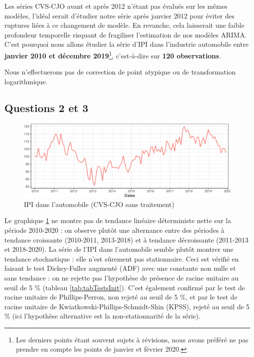 \documentclass[]{article}
\begin{document}
Les séries CVS-CJO avant et après 2012 n'étant pas évalués sur les mêmes modèles, l'idéal serait d'étudier notre série après janvier 2012 pour éviter des ruptures liées à ce changement de modèle. En revanche, cela laisserait une faible profondeur temporelle risquant de fragiliser l'estimation de nos modèles ARIMA.
C'est pourquoi nous allons étudier la série d'IPI dans l'industrie automobile entre \textbf{janvier 2010 et décembre 2019}\footnote{Les derniers points étant souvent sujets à révisions, nous avons préféré ne pas prendre en compte les points de janvier et février 2020.}, c'est-à-dire sur \textbf{120 observations}.

Nous n'effectuerons pas de correction de point atypique ou de transformation logarithmique.

\hypertarget{questions-2-et-3}{%
\subsection{Questions 2 et 3}\label{questions-2-et-3}}

\begin{figure}

{\centering \includegraphics{img/rmd-ipiBrut-1} 

}

\caption{IPI dans l'automobile (CVS-CJO sans traitement)}\label{fig:ipiBrut}
\end{figure}

Le graphique \ref{fig:ipiBrut} ne montre pas de tendance linéaire déterministe nette sur la période 2010-2020 : on observe plutôt une alternance entre des périodes à tendance croissante (2010-2011, 2013-2018) et à tendance décroissante (2011-2013 et 2018-2020).
La série de l'IPI dans l'automobile semble plutôt montrer une tendance stochastique : elle n'est sûrement pas stationnaire. Ceci est vérifié en faisant le test Dickey-Fuller augmenté (ADF) avec une constante non nulle et sans tendance : on ne rejette pas l'hypothèse de présence de racine unitaire au seuil de 5 \% (tableau \ref{tab:tabTestsInit}).
C'est également confirmé par le test de racine unitaire de Phillips-Perron, non rejeté au seuil de 5 \%, et par le test de racine unitaire de Kwiatkowski-Phillips-Schmidt-Shin (KPSS), rejeté au seuil de 5 \% (ici l'hypothèse alternative est la non-stationnarité de la série).
\end{document}
